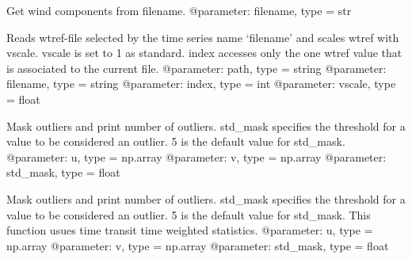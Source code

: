 \documentclass[letterpaper,10pt,english]{sphinxmanual}
\begin{document}

\begin{fulllineitems}
\label{\detokenize{index:windtunnel.get_wind_comps}}
Get wind components from filename.
@parameter: filename, type = str

\end{fulllineitems}


\begin{fulllineitems}
\label{\detokenize{index:windtunnel.get_wtref}}
Reads wtref-file selected by the time series name ‘filename’ and
scales wtref with vscale. vscale is set to 1 as standard. index 
accesses only the one wtref value that is associated to the current
file.
@parameter: path, type = string
@parameter: filename, type = string
@parameter: index, type = int
@parameter: vscale, type = float

\end{fulllineitems}


\begin{fulllineitems}
\label{\detokenize{index:windtunnel.mask_outliers}}
Mask outliers and print number of outliers. std\_mask specifies the
threshold for a value to be considered an outlier. 5 is the default 
value for std\_mask.
@parameter: u, type = np.array
@parameter: v, type = np.array
@parameter: std\_mask, type = float

\end{fulllineitems}


\begin{fulllineitems}
\label{\detokenize{index:windtunnel.mask_outliers_wght}}
Mask outliers and print number of outliers. std\_mask specifies the
threshold for a value to be considered an outlier. 5 is the default 
value for std\_mask. This function usues time transit time weighted 
statistics.
@parameter: u, type = np.array
@parameter: v, type = np.array
@parameter: std\_mask, type = float

\end{fulllineitems}
\end{document}
